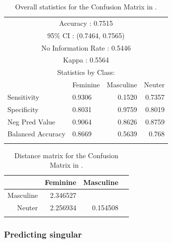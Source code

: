 \begin{table}[!htpb]
  \centering
  \begin{tabular}{llrr}
    \lsptoprule
    \multicolumn{4}{c}{Overall statistics:} \\

    \midrule
    \multicolumn{4}{c}{Accuracy : 0.7515}                                  \\
    \multicolumn{4}{c}{95\% CI : (0.7464, 0.7565)}                         \\
    \multicolumn{4}{c}{No Information Rate : 0.5446}                       \\
    \multicolumn{4}{c}{Kappa : 0.5564}                                     \\
    \midrule
    \multicolumn{4}{c}{Statistics by Class:}                               \\
    \midrule
                      & Feminine & Masculine & Neuter \\
    Sensitivity       & 0.9306          & 0.1520           & 0.7357        \\
    Specificity       & 0.8031          & 0.9759           & 0.8019        \\
    Neg Pred Value    & 0.9064          & 0.8626           & 0.8759        \\
    Balanced Accuracy & 0.8669          & 0.5639           & 0.768         \\
    \lspbottomrule
  \end{tabular}
  \caption{Overall statistics for the Confusion Matrix in .}\label{tab:gender-romanian-stats}
\end{table}

\begin{table}[!htpb]
  \centering
  \begin{tabular}{rrrr}
    \lsptoprule
              & Feminine & Masculine \\
    \midrule
    Masculine & 2.346527 &           \\
    Neuter    & 2.256934 & 0.154508  \\
    \lspbottomrule
  \end{tabular}
  \caption{Distance matrix for the Confusion Matrix in .}\label{tab:gender-romanian-distance}
\end{table}

\subsubsection{Predicting singular}

